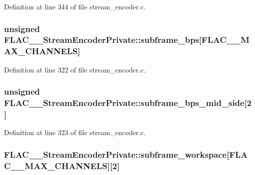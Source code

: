 Definition at line 344 of file stream\+\_\+encoder.\+c.

\subsubsection[{\texorpdfstring{subframe\+\_\+bps}{subframe_bps}}]{\setlength{\rightskip}{0pt plus 5cm}unsigned F\+L\+A\+C\+\_\+\+\_\+\+Stream\+Encoder\+Private\+::subframe\+\_\+bps\mbox{[}{\bf F\+L\+A\+C\+\_\+\+\_\+\+M\+A\+X\+\_\+\+C\+H\+A\+N\+N\+E\+LS}\mbox{]}}\hypertarget{struct_f_l_a_c_____stream_encoder_private_acd70e4f7d73544a7e3e201b81e1e77ee}{}\label{struct_f_l_a_c_____stream_encoder_private_acd70e4f7d73544a7e3e201b81e1e77ee}


Definition at line 322 of file stream\+\_\+encoder.\+c.

\subsubsection[{\texorpdfstring{subframe\+\_\+bps\+\_\+mid\+\_\+side}{subframe_bps_mid_side}}]{\setlength{\rightskip}{0pt plus 5cm}unsigned F\+L\+A\+C\+\_\+\+\_\+\+Stream\+Encoder\+Private\+::subframe\+\_\+bps\+\_\+mid\+\_\+side\mbox{[}2\mbox{]}}\hypertarget{struct_f_l_a_c_____stream_encoder_private_afb0ea25da76508a1d644ed81bf5cc205}{}\label{struct_f_l_a_c_____stream_encoder_private_afb0ea25da76508a1d644ed81bf5cc205}


Definition at line 323 of file stream\+\_\+encoder.\+c.

\subsubsection[{\texorpdfstring{subframe\+\_\+workspace}{subframe_workspace}}]{ F\+L\+A\+C\+\_\+\+\_\+\+Stream\+Encoder\+Private\+::subframe\+\_\+workspace\mbox{[}{\bf F\+L\+A\+C\+\_\+\+\_\+\+M\+A\+X\+\_\+\+C\+H\+A\+N\+N\+E\+LS}\mbox{]}\mbox{[}2\mbox{]}}\hypertarget{struct_f_l_a_c_____stream_encoder_private_a8cde3d683903e4e421f62c10b05a7d14}{}\label{struct_f_l_a_c_____stream_encoder_private_a8cde3d683903e4e421f62c10b05a7d14}


